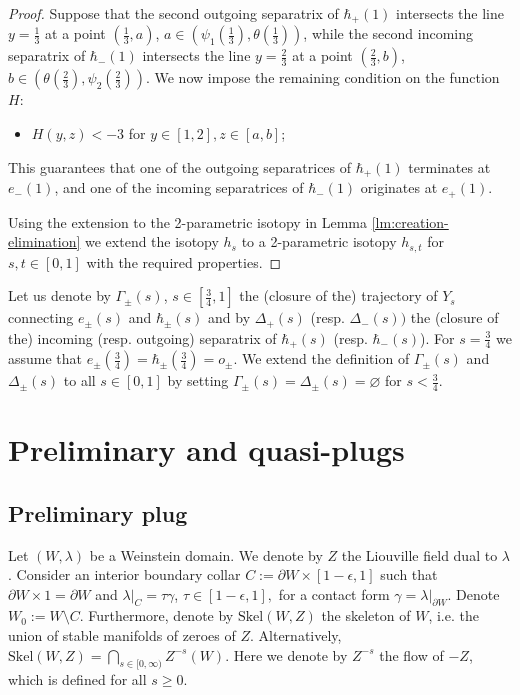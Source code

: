 \documentclass[12pt]{amsart}
\theoremstyle{plain}
\theoremstyle{definition}
\theoremstyle{remark}
\newcommand{\eps}{\epsilon}
\newcommand{\p}{\partial}
\newcommand{\Skel}{\mathrm{Skel}}
\begin{document}
\begin{proof}
  Suppose that the second outgoing separatrix of $\hbar_+(1)$ intersects the line $y=\frac13$ at a point $(\frac13,a)$, $a\in(\psi_1(\frac13),\theta(\frac13))$, while  the second  incoming separatrix of $\hbar_-(1)$ intersects the line $y=\frac23$ at a point $(\frac23,b)$, $b\in(\theta(\frac23),\psi_2(\frac23)) $. We  now impose the remaining condition on the function $H$:
  \begin{itemize}
  \item[(C6)] 
  $H(y,z)<-3$ for $y\in[1,2], z\in[a, b]$;
  \end{itemize}
   This guarantees that one of the outgoing separatrices of $\hbar_+(1)$ terminates at $e_-(1)$, and one of the incoming separatrices of $\hbar_-(1)$ originates at $e_+(1)$.
 
   Using the extension to the 2-parametric isotopy  in Lemma \ref{lm:creation-elimination} we extend the isotopy $h_s$ to a 2-parametric isotopy $h_{s,t}$ for $s,t\in[0,1]$ with the required properties.  \end{proof}

Let us denote by $\Gamma_\pm(s)$, $s\in[\frac34,1]$ the (closure of the) trajectory of $Y_s$ connecting $e_\pm(s)$ and $\hbar_\pm(s)$ and by $\Delta_+(s)$ (resp. $\Delta_-(s))$  the (closure of the) incoming (resp. outgoing) separatrix of $\hbar_+(s)$ (resp. $\hbar_-(s)$). For $s=\frac34$ we assume that $e_\pm(\frac34)=\hbar_\pm(\frac34)=o_\pm$.  We extend the definition of $\Gamma_\pm(s)$ and $\Delta_\pm(s)$ to all $s\in[0,1]$
by setting   $\Gamma_\pm(s)=\Delta_\pm(s)=\varnothing$ for $s<\frac34$.

\section{Preliminary and quasi-plugs}\label{sec:prelim-quasi-plugs}
 \subsection{Preliminary plug}\label{sec:prelim-plug}
 Let $(W,\lambda)$ be a Weinstein domain. We denote by $Z$ the Liouville field dual to $\lambda$. Consider an interior  boundary collar $C:=\p W\times[  1-\eps,1]$ such that $\p W\times1=\p W$ and $\lambda|_C=\tau\gamma$, $\tau\in[1-\eps,1],$ for a contact form $\gamma=\lambda|_{\p W}$.
 Denote $W_0:=W\setminus C$.  Furthermore, denote by $\Skel(W,Z)$ the skeleton of $W$, i.e. the union of stable manifolds of zeroes of $Z$.
 Alternatively, $\Skel(W,Z)=\bigcap\limits_{s\in[0,\infty)}Z^{-s}(W)$. Here we denote by $Z^{-s}$ the    flow of  $-Z$, which is defined for all $s\geq 0$.
 
\end{document}
